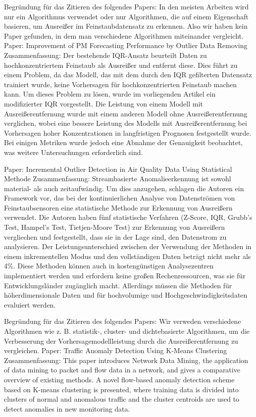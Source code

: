 Begründung für das Zitieren des folgendes Papers: In den meisten Arbeiten wird nur ein Algorithmus verwendet oder nur Algorithmen, die auf einem Eigenschaft basieren, um Ausreißer im Feinstaubdatensatz zu erkennen. Also wir haben kein Paper gefunden, in dem man verschiedene Algorithmen miteinander vergleicht.
Paper: Improvement of PM Forecasting Performance by Outlier Data Removing
Zusammenfassung: Der bestehende IQR-Ansatz beurteilt Daten zu hochkonzentriertem Feinstaub als Ausreißer und entfernt diese. Dies führt zu einem Problem, da das Modell, das mit dem durch den IQR gefilterten Datensatz trainiert wurde, keine Vorhersagen für hochkonzentrierten Feinstaub machen kann. Um dieses Problem zu lösen, wurde im vorliegenden Artikel ein modifizierter IQR vorgestellt. Die Leistung von einem Modell mit Ausreißerentfernung wurde mit einem anderen Modell ohne Ausreißerentfernung verglichen, wobei eine bessere Leistung des Modells mit Ausreißerentfernung bei Vorhersagen hoher Konzentrationen in langfristigen Prognosen festgestellt wurde. Bei einigen Metriken wurde jedoch eine Abnahme der Genauigkeit beobachtet, was weitere Untersuchungen erforderlich sind.

Paper: Incremental Outlier Detection in Air Quality Data Using Statistical Methode
Zusammenfassung: Streambasierte Anomalieerkennung ist sowohl material- als auch zeitaufwändig. Um dies anzugehen, schlagen die Autoren ein Framework vor, das bei der kontinuierlichen Analyse von Datenströmen von Feinstaubsensoren eine statistische Methode zur Erkennung von Ausreißern verwendet. Die Autoren haben fünf statistische Verfahren (Z-Score, IQR, Grubb's Test, Hampel's Test, Tietjen-Moore Test) zur Erkennung von Ausreißern vergliechen und festgestellt, dass sie in der Lage sind, den Datenstrom zu analysieren. Der Leistungsunterschied zwischen der Verwendung der Methoden in einem inkrementellen Modus und den vollständigen Daten beträgt nicht mehr als 4\%. Diese Methoden können auch in kostengünstigen Analysezentren implementiert werden und erfordern keine großen Rechenressourcen, was sie für Entwicklungsländer zugänglich macht. Allerdings müssen die Methoden für höherdimensionale Daten und für hochvolumige und Hochgeschwindigkeitsdaten evaluiert werden.

Begründung für das Zitieren des folgendes Papers: Wir verweden verschiedene Algorithmen wie z. B. statistik-, cluster- und dichtebasierte Algorithmen, um die Verbesserung der Vorhersagemodellleistung durch die Ausreißerentfernung zu vergleichen.
Paper: Traffic Anomaly Detection Using K-Means Clustering
Zusammenfassung: This paper introduces Network Data Mining, the application of data mining to packet and flow data in a network, and gives a comparative overview of existing methods. A novel flow-based anomaly detection scheme based on K-means clustering is presented, where training data is divided into clusters of normal and anomalous traffic and the cluster centroids are used to detect anomalies in new monitoring data.

